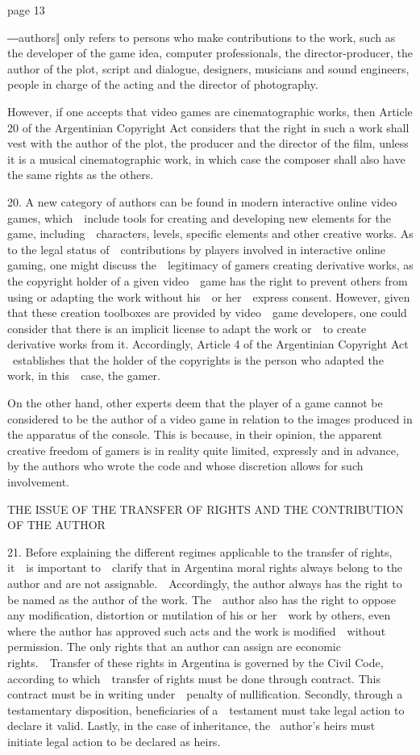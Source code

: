 \documentclass[
]{article}
\begin{document}
{page 13}

{―authors‖ only refers to persons who make contributions to the work,
such as the }{developer of the game idea, computer professionals, the
director-producer, the author of the plot, script and dialogue,
designers, musicians and sound engineers, people in charge of the acting
and the director of photography.}

{However, if one accepts that video games are cinematographic works,
then Article 20 of the Argentinian }{Copyright Act }{considers that the
right in such a work shall vest with the author of the plot, the
producer and the director of the film, unless it is a musical
cinematographic work, in which case the composer shall also have the
same rights as the others.}

{20. }{A new category of authors can be found in modern interactive
online video games, which~~include tools for creating and developing new
elements for the game, including~~characters, levels, specific elements
and other creative works. As to the legal status of~~contributions by
players involved in interactive online gaming, one might discuss
the~~legitimacy of gamers creating derivative works, as the copyright
holder of a given video~~game has the right to prevent others from using
or adapting the work without his~~or her~~express consent. However,
given that these creation toolboxes are provided by video~~game
developers, one could consider that there is an implicit license to
adapt the work or~~to create derivative works from it. Accordingly,
Article 4 of the Argentinian }{Copyright Act }{~establishes that the
holder of the copyrights is the person who adapted the work, in
this~~case, the gamer.}

{On the other hand, other experts deem that the player of a game cannot
be considered to be the author of a video game in relation to the images
produced in the apparatus of the console. This is because, in their
opinion, the apparent creative freedom of gamers is in reality quite
limited, expressly and in advance, by the authors who wrote the code and
whose discretion allows for such involvement.}

{THE ISSUE OF THE TRANSFER OF RIGHTS AND THE CONTRIBUTION OF THE AUTHOR}

{21. }{Before explaining the different regimes applicable to the
transfer of rights, it~~is important to~~clarify that in Argentina moral
rights always belong to the author and are not assignable.~~Accordingly,
the author always has the right to be named as the author of the work.
The~~author also has the right to oppose any modification, distortion or
mutilation of his or her~~work by others, even where the author has
approved such acts and the work is modified~~without permission. The
only rights that an author can assign are economic rights.~~Transfer of
these rights in Argentina is governed by the }{Civil Code, }{according
to which~~transfer of rights must be done through contract. This
contract must be in writing under~~penalty of nullification. Secondly,
through a testamentary disposition, beneficiaries of a~~testament must
take legal action to declare it valid. Lastly, in the case of
inheritance, the }{~author's heirs must initiate legal action to be
declared as heirs.}
\end{document}
